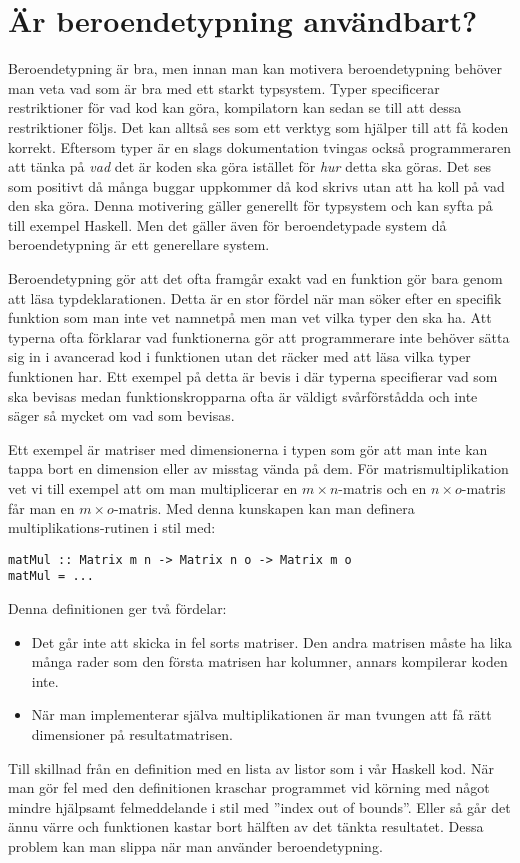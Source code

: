 \section{Är beroendetypning användbart?}
Beroendetypning är bra, men innan man kan motivera beroendetypning behöver man
veta vad som är bra med ett starkt typsystem.
Typer specificerar restriktioner för vad kod kan göra, kompilatorn kan sedan se
till att dessa restriktioner följs. Det kan alltså ses som ett verktyg som
hjälper till att få koden korrekt. Eftersom typer är en slags dokumentation
tvingas också programmeraren att tänka på
\emph{vad} det är koden ska göra istället för \emph{hur} detta ska göras. Det
ses som positivt då många buggar uppkommer då kod skrivs utan att ha koll på
vad den ska göra. Denna motivering gäller generellt för typsystem och kan syfta
på till exempel Haskell. Men det gäller även för beroendetypade system då
beroendetypning är ett generellare system.

Beroendetypning gör att det ofta framgår exakt vad en funktion gör bara genom
att läsa typdeklarationen. Detta är en stor fördel när man söker efter en
specifik funktion som man inte vet namnetpå men man vet vilka typer den ska ha.
Att typerna ofta förklarar vad funktionerna gör att programmerare inte behöver
sätta sig in i avancerad kod i funktionen utan det räcker med att läsa vilka
typer funktionen har. Ett exempel på detta är bevis i \coq där typerna
specifierar vad som ska bevisas medan funktionskropparna ofta är väldigt
svårförstådda och inte säger så mycket om vad som bevisas.

Ett exempel är matriser med dimensionerna i typen som gör att man inte kan
tappa bort en dimension eller av misstag vända på dem. För matrismultiplikation
vet vi till exempel att om man multiplicerar en $m \times n$-matris och en
$n \times o$-matris får man en $m \times o$-matris. Med denna kunskapen kan
man definera multiplikations-rutinen i stil med:

\begin{verbatim}
matMul :: Matrix m n -> Matrix n o -> Matrix m o
matMul = ...
\end{verbatim}

Denna definitionen ger två fördelar:

\begin{itemize}
  \item Det går inte att skicka in fel sorts matriser. Den andra matrisen måste
    ha lika många rader som den första matrisen har kolumner, annars kompilerar
    koden inte.
  \item När man implementerar själva multiplikationen är man tvungen att få rätt
    dimensioner på resultatmatrisen.
\end{itemize}

Till skillnad från en definition med en lista av listor som i vår Haskell kod.
När man gör fel med den definitionen kraschar programmet vid körning med något
mindre hjälpsamt felmeddelande i stil med ''index out of bounds''. Eller så går
det ännu värre och funktionen kastar bort hälften av det tänkta resultatet.
Dessa problem kan man slippa när man använder beroendetypning.
